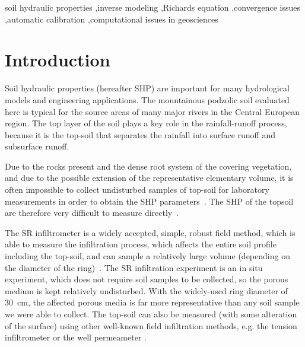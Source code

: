 \documentclass[review,times,3p,10pt]{elsarticle}
\newcommand{\mich}[1]{{\color{magenta}{#1}}}
\begin{document}
\begin{frontmatter}
\begin{abstract}

\end{abstract}

\begin{keyword}
soil hydraulic properties \sep inverse modeling \sep Richards equation \sep convergence issues  \sep automatic calibration \sep computational issues in geosciences  


\end{keyword}

\end{frontmatter}

\linenumbers

\section{Introduction}%

Soil hydraulic properties (hereafter SHP) are important for many hydrological models and engineering applications. The mountainous podzolic soil evaluated here is typical for the source areas of many major rivers in the Central European region. The top layer of the soil plays a key role in the rainfall-runoff process, because it is the top-soil that separates the rainfall into surface runoff and subsurface runoff. 


Due to the rocks present and the dense root system of the covering vegetation, and due to the possible extension of the representative elementary volume, it is often impossible to collect undisturbed samples of top-soil for laboratory measurements in order to obtain the SHP parameters~\citep{Jacka1}. The SHP of the topsoil are therefore very difficult to measure directly~\citep{Fodor, Jacka1}. 


 
\mich{In our study, we explore an applicability of the well-known single ring (hereafter SR) infiltration for evaluating the SHPs of the top soil from an unsteady part of this experiment.}
The SR infiltrometer is a widely accepted, simple, robust field method, which is able to measure the infiltration process, which affects the entire soil profile including the top-soil,  and can sample a relatively large volume (depending on the diameter of the ring)~\citep{Cheng,ReynoldsWD}.  The SR infiltration experiment is an in situ experiment, which does not require soil samples to be collected, so the porous medium is kept relatively undisturbed. With the widely-used ring diameter of 30~cm, the affected porous media is far more representative than any soil sample we were able to collect. The top-soil can also be measured (with some alteration of the surface) using other well-known field infiltration methods, e.g. the tension infiltrometer or the well permeameter  \citep{AnguloJaramillo,ReynoldsWDGP}. 
\end{document}
